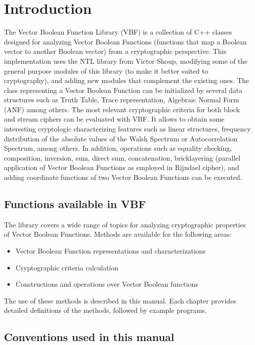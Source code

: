 \chapter{Introduction}

The Vector Boolean Function Library (VBF) is a collection of C++ classes designed for analyzing Vector Boolean Functions (functions that map a Boolean vector to another Boolean vector) from a cryptographic perspective. This implementation uses the NTL library from Victor Shoup, modifying some of the general purpose modules of this library (to make it better suited to cryptography), and adding new modules that complement the existing ones. The class representing a Vector Boolean Function can be initialized by several data structures such as Truth Table, Trace representation, Algebraic Normal Form (ANF) among others. The most relevant cryptographic criteria for both block and stream ciphers can be evaluated with VBF. It allows to obtain some interesting cryptologic characterizing features such as linear structures, frequency distribution of the absolute values of the Walsh Spectrum or Autocorrelation Spectrum, among others. In addition, operations such as equality checking, composition, inversion, sum, direct sum, concatenation, bricklayering (parallel application of Vector Boolean Functions as employed in Rijndael cipher), and adding coordinate functions of two Vector Boolean Functions can be executed.

\section{Functions available in VBF}\label{sec:Functions}

The library covers a wide range of topics for analyzing cryptographic properties of Vector Boolean Functions. Methods are available for the following areas:

\begin{itemize}
\item Vector Boolean Function representations and characterizations
\item Cryptographic criteria calculation
\item Constructions and operations over Vector Boolean functions
\end{itemize}

The use of these methods is described in this manual. Each chapter provides detailed definitions of the methods, followed by example programs.

\section{Conventions used in this manual}\label{sec:Conventions}

